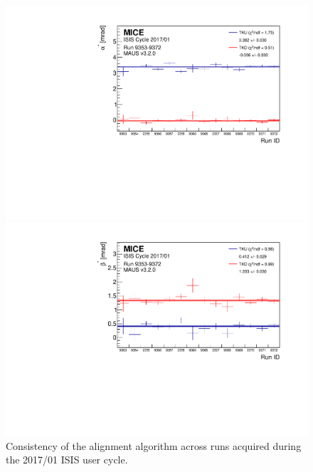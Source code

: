 \begin{figure} [!htb]
	\begin{minipage}[b]{.49\textwidth}
		\centering
		\includegraphics[width=\textwidth]{data_final/alpha_bestfit.pdf}
	\end{minipage}
	\hfill
	\begin{minipage}[b]{.49\textwidth}
		\centering
		\includegraphics[width=\textwidth]{data_final/beta_bestfit.pdf}
	\end{minipage}
	\caption{Consistency of the alignment algorithm across runs acquired during the 2017/01 ISIS user cycle.}
	\label{fig:runtorun}
\end{figure}

